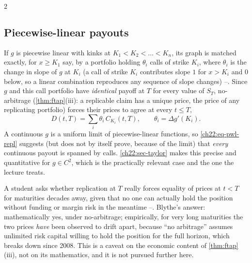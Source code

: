 \begin{paracol}{2}
\subsection{Piecewise-linear payouts}\label{ch22:sec-pwl}
If $g$ is piecewise linear with kinks at $K_1<K_2<\dots<K_n$, its graph is matched exactly, for
$x\ge K_1$ say, by a portfolio holding $\theta_i$ calls of strike $K_i$, where $\theta_i$ is the
change in slope of $g$ at $K_i$ (a call of strike $K_i$ contributes slope $1$ for $x>K_i$ and $0$
below, so a linear combination reproduces any sequence of slope changes)
--. Since $g$ and this call portfolio have \emph{identical} payoff
at $T$ for every value of $S_T$, no-arbitrage (\cref{thm:ftap}(iii): a replicable claim has a unique
price, the price of any replicating portfolio) forces their prices to agree at every $t\le T$,
\begin{equation}\label{ch22:eq-pwl-repl}
  D(t,T) = \sum_i \theta_i\, C_{K_i}(t,T), \qquad \theta_i=\Delta g'(K_i).
\end{equation}
A continuous $g$ is a uniform limit of piecewise-linear functions, so \eqref{ch22:eq-pwl-repl} suggests
(but does not by itself prove, because of the limit) that \emph{every} continuous payout is spanned by
calls. \cref{ch22:sec-taylor} makes this precise and quantitative for $g\in C^2$, which is the
practically relevant case and the one the lecture treats.

\begin{coursenote}
A student asks whether replication at $T$ really forces equality of prices at $t<T$ for maturities
decades away, given that no one can actually hold the position without funding or margin risk in the
meantime --. Blythe's answer: mathematically yes, under
no-arbitrage; empirically, for very long maturities the two prices \emph{have} been observed to drift
apart, because ``no arbitrage'' assumes unlimited risk capital willing to hold the position for the
full horizon, which breaks down since 2008. This is a caveat on the economic content of
\cref{thm:ftap}(iii), not on its mathematics, and it is not pursued further here.
\end{coursenote}


\end{paracol}

